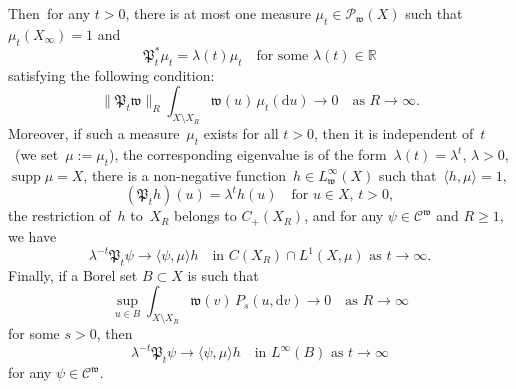 \documentclass[AHL,Unicode,longabstracts]{cedram}
\DeclareMathOperator{\supp}{supp}
\newcommand{\R}{{\mathbb R}}
\newcommand{\CC}{{\mathcal C}}
\newcommand{\la}{\lambda}
\newcommand{\ty}{\infty}
\newcommand{\wwww}{{\mathfrak w}}
\newcommand{\PPPP}{{\mathfrak P}}
\newcommand{\lag}{\langle}
\newcommand{\rag}{\rangle}
\newcommand{\dd}{\mathrm{d}}
\begin{document}
\begin{theo}
Then~for any $t>0$, there is at most one measure $\mu_t\in{\mathcal P}_\wwww(X)$ such that $\mu_t(X_\ty)=1$ and
\[
\PPPP^*_t \mu_t=\la(t)\mu_t \quad \text{for some $\la(t)\in \R$}
\]
satisfying the following condition:
\[
\|\PPPP_t\wwww\|_R\int_{X\setminus X_R}\wwww(u)\, \mu_t(\dd u)\to0
\quad\mbox{as $R\to\infty$}.
\]
Moreover, if such a measure~$\mu_t$ exists for all $t>0$, then it is independent of~$t$~(we set~$\mu:=\mu_t$), the corresponding eigenvalue is of the form~$\lambda(t)=\la^t$, $\la>0$, $\supp \mu=X$, there is a non-negative function~$h\in L^\ty_\wwww(X)$ such that~$\lag h,\mu\rag=1$,
\[
(\PPPP_t h)(u)=\lambda^t h(u)\quad\mbox{for $u\in X$, $t>0$},
\]
the restriction of~$h$ to~$X_R$ belongs to $C_+(X_R)$,
and for any $\psi\in \CC^\wwww$ and $R\ge1$, we have
\begin{equation}
\lambda^{-t}\PPPP_t \psi\to\lag \psi,\mu\rag h
\quad\text{in~$C(X_R)\cap L^1(X,\mu)$ as~$t\to\infty$}. \label{5.12}
\end{equation}
Finally, if a Borel set $B\subset X$ is such that
\begin{equation}
\sup_{u\in B} \int_{X\setminus X_R}\wwww(v)\,P_s(u,\dd v) \to0
\quad\text{as $R\to\infty$} \label{5.13}
\end{equation}
for some $s>0$,
then
\[
\lambda^{-t}\PPPP_t \psi\to\lag \psi,\mu\rag h
\quad\text{in~$L^\ty(B)$ as~$t\to\infty$}
\]
for any $\psi\in \CC^\wwww$.
\end{theo}


\end{document}

